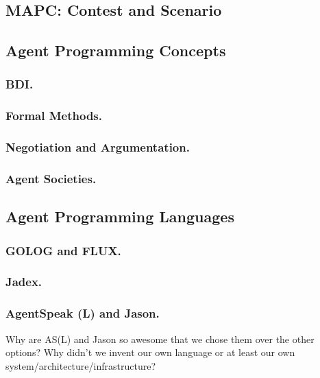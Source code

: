 \subsection{MAPC: Contest and Scenario}
\subsection{Agent Programming Concepts}
\subsubsection{BDI.}
\subsubsection{Formal Methods.}
\subsubsection{Negotiation and Argumentation.}
\subsubsection{Agent Societies.}
\subsection{Agent Programming Languages}
\subsubsection{GOLOG and FLUX.}
\subsubsection{Jadex.}
\subsubsection{AgentSpeak (L) and Jason.}
Why are AS(L) and Jason so awesome that we chose them over the other options? Why didn't we invent our own language or at least our own system/architecture/infrastructure?
